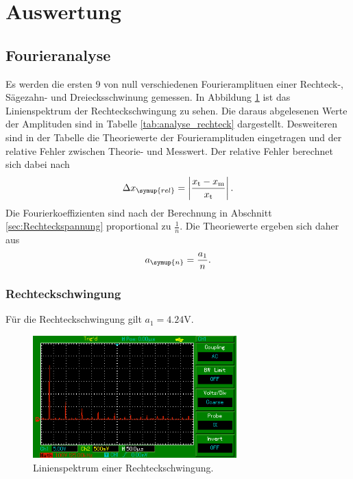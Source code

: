 \section{Auswertung}
\label{sec:Auswertung}
\subsection{Fourieranalyse}
Es werden die ersten 9 von null verschiedenen Fourieramplituen einer Rechteck-,
Sägezahn- und Dreiecksschwinung gemessen.
In Abbildung \ref{fig:linienspektrum_rechteck} ist das Linienspektrum der
Rechteckschwingung zu sehen. Die daraus abgelesenen Werte der Amplituden sind in
Tabelle \ref{tab:analyse_rechteck} dargestellt. Desweiteren sind in der Tabelle
die Theoriewerte der Fourieramplituden eingetragen und der relative Fehler
zwischen Theorie- und Messwert.
Der relative Fehler berechnet sich dabei nach
\begin{equation}
  \Delta x_\symup{rel} = \left|\frac{x_\text{t} - x_\text{m}}
  {x_\text{t}} \right|.
  \label{eqn:relativer_fehler}
\end{equation}
Die Fourierkoeffizienten sind nach der Berechnung in Abschnitt \ref{sec:Rechteckspannung}
proportional zu $\frac{1}{n}$. Die Theoriewerte ergeben sich daher aus
\begin{equation}
  a_\symup{n} = \frac{a_1}{n}.
  \label{eqn:a_n_rechteck}
\end{equation}
\newpage
\subsubsection{Rechteckschwingung}
Für die Rechteckschwingung gilt $a_1 = 4.24 \si{\volt}$.
\begin{figure}
  \centering
  \includegraphics[width=0.7\textwidth]{linienspektrum_rechteck.png}
  \caption{Linienspektrum einer Rechteckschwingung.}
  \label{fig:linienspektrum_rechteck}
\end{figure}

